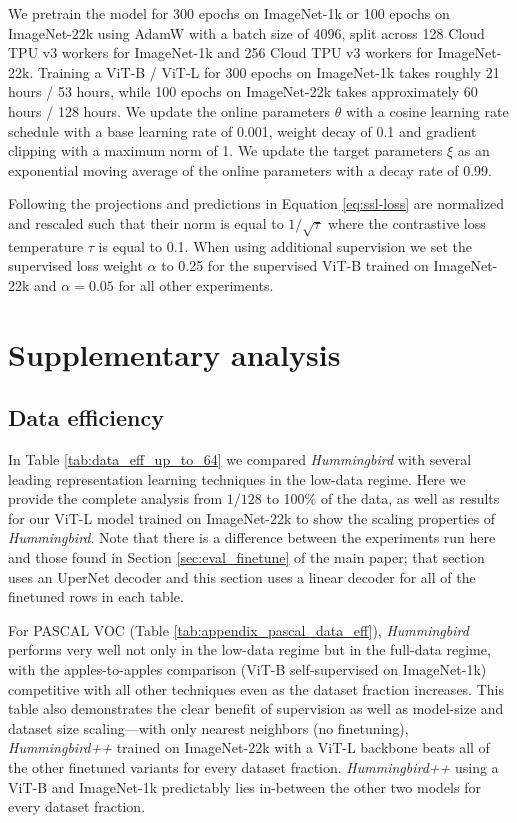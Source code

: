 \documentclass{article}
\newcommand{\ours}{\textit{Hummingbird} }
\newcommand{\oursup}{\textit{Hummingbird}\textit{++} }
\begin{document}
We pretrain the model for 300 epochs on ImageNet-1k or 100 epochs on ImageNet-22k using AdamW \cite{loshchilov2019decoupled} with a batch size of 4096, split across 128 Cloud TPU v3 workers for ImageNet-1k and 256 Cloud TPU v3 workers for ImageNet-22k. Training a ViT-B / ViT-L for 300 epochs on ImageNet-1k takes roughly 21 hours / 53 hours, while 100 epochs on ImageNet-22k takes approximately 60 hours / 128 hours. We update the online parameters $\theta$ with a cosine learning rate schedule with a base learning rate of 0.001, weight decay of 0.1 and gradient clipping with a maximum norm of 1. We update the target parameters $\xi$ as an exponential moving average of the online parameters with a decay rate of 0.99. 
 
Following \cite{chen2020simple} the projections and predictions in Equation \ref{eq:ssl-loss} are normalized and rescaled such that their norm is equal to $1 / \sqrt{\tau}$ where the contrastive loss temperature $\tau$ is equal to 0.1. When using additional supervision we set the supervised loss weight $\alpha$ to 0.25 for the supervised ViT-B trained on ImageNet-22k and $\alpha\!=\!0.05$ for all other experiments.

\section{Supplementary analysis}

\subsection{Data efficiency}
\label{sec:app-data-efficiency}

In Table \ref{tab:data_eff_up_to_64} we compared \ours with several leading representation learning techniques in the low-data regime. Here we provide the complete analysis from \(1/128\) to 100\% of the data, as well as results for our ViT-L model trained on ImageNet-22k to show the scaling properties of \textit{Hummingbird}. Note that there is a difference between the experiments run here and those found in Section \ref{sec:eval_finetune} of the main paper; that section uses an UperNet \cite{xiao2018unified} decoder and this section uses a linear decoder for all of the finetuned rows in each table.

For PASCAL VOC (Table \ref{tab:appendix_pascal_data_eff}), \ours performs very well not only in the low-data regime but in the full-data regime, with the apples-to-apples comparison (ViT-B self-supervised on ImageNet-1k) competitive with all other techniques even as the dataset fraction increases. This table also demonstrates the clear benefit of supervision as well as model-size and dataset size scaling---with only nearest neighbors (no finetuning), \oursup trained on ImageNet-22k with a ViT-L backbone beats all of the other finetuned variants for every dataset fraction. \oursup using a ViT-B and ImageNet-1k predictably lies in-between the other two models for every dataset fraction.
\end{document}

